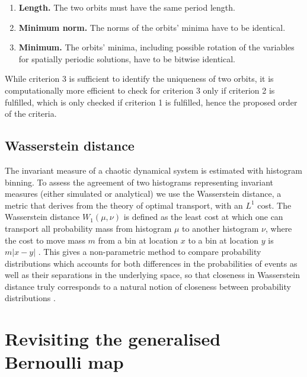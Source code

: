 \begin{enumerate}
\item \textbf{Length.} The two orbits must have the same period length.
\item \textbf{Minimum norm.} The norms of the orbits’ minima have to be identical.
\item \textbf{Minimum.} The orbits’ minima, including possible rotation of the variables for spatially periodic solutions, have to be bitwise identical.
\end{enumerate}

While criterion 3 is sufficient to identify the uniqueness of two orbits, it is computationally more efficient to check for criterion 3
only if criterion 2 is fulfilled, which is only checked if criterion 1 is fulfilled, hence the proposed order of the criteria.
\subsection{Wasserstein distance}
\label{sec:wasserstein}

The invariant measure of a chaotic dynamical system is estimated with histogram binning. To assess the agreement
of two histograms representing invariant measures (either simulated or analytical) we use the Wasserstein distance,
a metric that derives from the theory of optimal transport, with an $L^1$ cost. The Wasserstein distance $W_1(\mu,\nu)$
is defined as the least cost at which one can transport all probability mass from histogram $\mu$ to another histogram $\nu$,
where the cost to move mass $m$ from a bin at location $x$ to a bin at location $y$ is $m \vert x-y \vert$ \citep{Paxton2021,Villani2003}.
This gives a non-parametric method to compare probability distributions which accounts for both differences in the probabilities
of events as well as their separations in the underlying space, so that closeness in Wasserstein distance truly corresponds
to a natural notion of closeness between probability distributions \citep[Thm 7.12]{Villani2003}.

\section{Revisiting the generalised Bernoulli map}
\label{sec:revisit_bernoulli}

